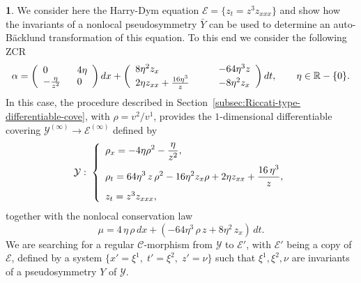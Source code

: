 \documentclass[12pt,english]{elsarticle}
\theoremstyle{plain}
\theoremstyle{plain}
\theoremstyle{remark}
\theoremstyle{plain}
\theoremstyle{definition}
\theoremstyle{definition}
\newtheorem{example}[thm]{\protect\examplename}
\providecommand{\examplename}{Example}
\begin{document}
\begin{example}
\label{exmp33}
We consider here the Harry-Dym equation
$\mathcal{E}=\{z_{t}=z^{3}z_{xxx}\}$ and show how the invariants of a nonlocal
pseudosymmetry $\bar{Y}$ can be used to determine an auto-B\"{a}cklund
transformation of this equation. To this end we consider the following
ZCR
%
\begin{equation*}
\alpha =\left ({\displaystyle
%
\begin{array}{l@{\quad}l}
0\qquad & 4\eta
\\
-\frac{\eta}{z^{2}} & 0
\end{array}
%
}\right )dx+\left ({\displaystyle
%
\begin{array}{l@{\quad}l}
8\eta ^{2}z_{x}\qquad & -64\eta ^{3}z
\\
2\eta z_{xx}+\frac{16\eta ^{3}}{z}\qquad & -8\eta ^{2}z_{x}
\end{array}
%
}\right )dt,\qquad \eta \in \mathbb{R}-\{0\}.
\end{equation*}
%
In this case, the procedure described in Section~\ref{subsec:Riccati-type-differentiable-cove}, with
$\rho =v^{2}/v^{1}$, provides the $1$-dimensional differentiable covering
$\mathcal{Y}^{(\infty )}\rightarrow \mathcal{E}^{(\infty )}$ defined by
%
\begin{equation*}
\mathcal{Y}:\;\left \{
%
\begin{array}{l}
{\displaystyle \rho _{x}=-4\eta \rho ^{2}-\frac{\eta}{z^{2}}},
\vspace{5pt}
\\
{\displaystyle \rho _{t}=64\eta ^{3}\,z\,\rho ^{2}-16\eta ^{2}z_{x}
\rho +2\eta z_{xx}+\frac{16\,\eta ^{3}}{z}},
\vspace{5pt}
\\
z_{t}=z^{3}z_{xxx},
\end{array}
%
\right .
\end{equation*}
%
together with the nonlocal conservation law
%
\begin{equation*}
\mu =4\,\eta \,\rho \,dx+\left (-64\eta ^{3}\,\rho \,z+8\eta ^{2}\,z_{x}
\right )\,dt.
\end{equation*}
%
We are searching for a regular $\mathcal{C}$-morphism from
$\mathcal{Y}$ to $\mathcal{E}'$, with $\mathcal{E}'$ being a copy of
$\mathcal{E}$, defined by a system
$\{x'=\xi ^{1},\;t'=\xi ^{2},\;z'=\nu \}$ such that
$\xi ^{1},\xi ^{2},\nu $ are invariants of a pseudosymmetry $Y$ of
$\mathcal{Y}$.


\end{example}
\end{document}
